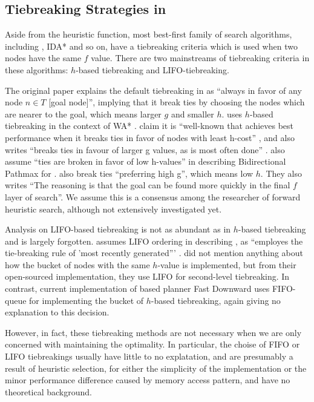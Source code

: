 \subsection{Tiebreaking Strategies in \astar}

Aside from the heuristic function, most best-first family of search
algorithms, including \astar, IDA* and so on, have a tiebreaking criteria which is used
when two nodes have the same $f$ value.
There are two mainstreams of tiebreaking criteria in these algorithms:
$h$-based tiebreaking and LIFO-tiebreaking.

The original \astar paper \cite{hart1968formal} explains the default
tiebreaking in \astar as ``always in favor of any node $n \in T$ [goal
node]'', implying that it break ties by choosing the nodes which are
nearer to the goal, which means larger $g$ and smaller $h$.
\citeauthor{Korf1985depth} uses $h$-based tiebreaking in the context of WA*
\cite{korf1993linear}.  \citeauthor{hansen2007anytime} claim it is
``well-known that \astar achieves best performance when it breaks ties
in favor of nodes with least h-cost'' \cite{hansen2007anytime}, and
\citeauthor{holte2010common} also writes ``\astar breaks ties in favour
of larger g values, as is most often done'' \cite{holte2010common}.
\citeauthor{felner2011inconsistent} also assume ``ties are broken in
favor of low h-values'' in describing Bidirectional Pathmax for \astar.
\citeauthor{burns2012implementing} also break ties ``preferring high
g'', which means low $h$. They also writes ``The reasoning is that the
goal can be found more quickly in the final $f$ layer of search''. We
assume this is a consensus among the researcher of forward heuristic
search, although not extensively investigated yet.

Analysis on LIFO-based tiebreaking is not as abundant as in $h$-based
tiebreaking and is largely forgotten.
\citeauthor{Korf1985depth} assumes LIFO ordering in describing \astar,
as ``\astar employes the tie-breaking rule of 'most
recently generated''' \cite{Korf1985depth}.
\citeauthor{burns2012implementing} did not mention anything about how
the bucket of nodes with the same $h$-value is implemented, but from their
open-sourced implementation, they use LIFO for second-level tiebreaking. 
In contrast, current implementation of \sota \astar based planner Fast
Downward \cite{Helmert2006} uses FIFO-queue for implementing the bucket
of $h$-based tiebreaking, again giving no explanation to this decision.


However, in fact, these tiebreaking methods are not necessary when we
are only concerned with maintaining the optimality. In particular, the
choise of FIFO or LIFO tiebreakings usually have little to no
explatation, and are presumably a result of heuristic selection, for
either the simplicity of the implementation or the minor performance difference
caused by memory access pattern, and have no theoretical background.








